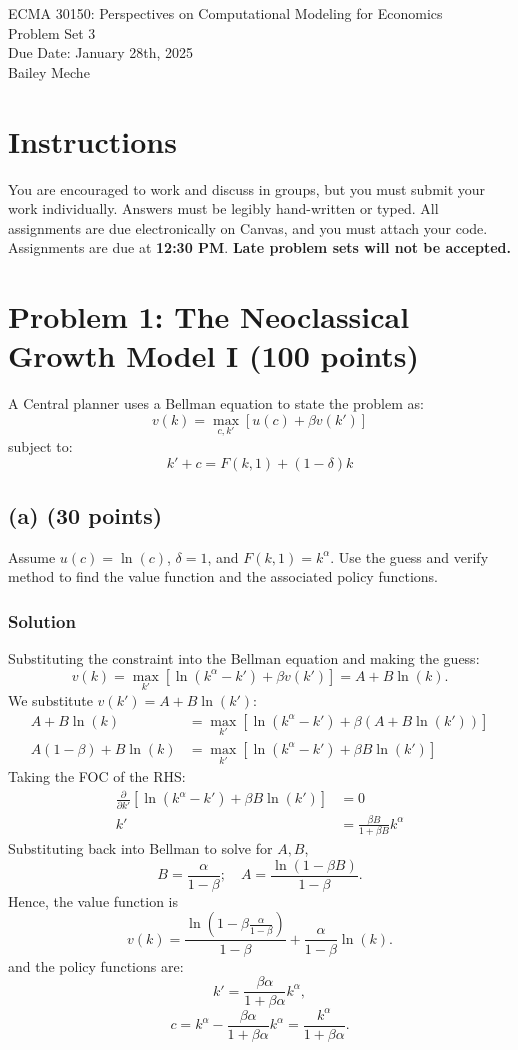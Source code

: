 \documentclass[12pt]{article}
\begin{document}
	\begin{center}
		ECMA 30150: Perspectives on Computational Modeling for Economics\\
        Problem Set 3 \\
		Due Date: January 28th, 2025 \\
        Bailey Meche
	\end{center}

\section*{Instructions}
You are encouraged to work and discuss in groups, but you must submit your work individually. Answers must be legibly hand-written or typed. All assignments are due electronically on Canvas, and you must attach your code. Assignments are due at \textbf{12:30 PM}. \textbf{Late problem sets will not be accepted.}

\section*{Problem 1: The Neoclassical Growth Model I (100 points)}
A Central planner uses a Bellman equation to state the problem as:
\[
v(k) = \max_{c,k'} \left[ u(c) + \beta v(k') \right]
\]
subject to:
\[
k' + c = F(k, 1) + (1 - \delta)k
\]

\subsection*{(a) (30 points)}
Assume \( u(c) = \ln(c) \), \( \delta = 1 \), and \( F(k, 1) = k^\alpha \). Use the guess and verify method to find the value function and the associated policy functions.

\subsubsection*{Solution}

Substituting the constraint into the Bellman equation and making the guess: 
\[
v(k) = \max_{k'} \left[ \ln(k^\alpha -k') + \beta v(k') \right] = A+B\ln(k).
\]
We substitute $v(k') = A+B\ln(k')$:
\begin{align*}
    A+B\ln(k) &= \max_{k'} \left[ \ln(k^\alpha -k') + \beta (A+B\ln(k')) \right] 
    \\ A(1-\beta) + B\ln(k) &= \max_{k'} \left[ \ln(k^\alpha -k') + \beta B\ln(k') \right] 
\end{align*}
Taking the FOC of the RHS:
\begin{align*}
   \frac{\partial}{\partial k'}\left[ \ln(k^\alpha -k') + \beta B\ln(k') \right]&=0
   \\ k' &= \frac{\beta B}{1 + \beta B}k^\alpha
\end{align*}
Substituting back into Bellman to solve for $A,B$,
\[ B = \frac{\alpha}{1-\beta}; \quad A = \frac{\ln(1-\beta B)}{1-\beta}.\]
Hence, the value function is
\[
v(k) = \frac{\ln(1 - \beta \frac{\alpha}{1 - \beta})}{1 - \beta} + \frac{\alpha}{1 - \beta} \ln(k).
\]
and the policy functions are:
\[
k' = \frac{\beta \alpha}{1 + \beta \alpha} k^\alpha,
\]
\[
c = k^\alpha - \frac{\beta \alpha}{1 + \beta \alpha} k^\alpha = \frac{k^\alpha}{1 + \beta \alpha}.
\]
\end{document}
